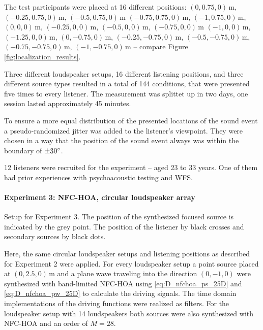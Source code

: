 The test participants were placed at 16 different positions: $(0,0.75,0)$\,m,
$(-0.25,0.75,0)$\,m, $(-0.5,0.75,0)$\,m $(-0.75,0.75,0)$\,m, $(-1,0.75,0)$\,m,
$(0,0,0)$\,m, $(-0.25,0,0)$\,m, $(-0.5,0,0)$\,m, $(-0.75,0,0)$\,m $(-1,0,0)$\,m,
$(-1.25,0,0)$\,m, $(0,-0.75,0)$\,m, $(-0.25,-0.75,0)$\,m, $(-0.5,-0.75,0)$\,m,
$(-0.75,-0.75,0)$\,m, $(-1,-0.75,0)$\,m -- compare
Figure\,\ref{fig:localization_results}.

Three different loudspeaker setups, 16 different listening positions, and
three different source types resulted in a total of 144 conditions, that were
presented five times to every listener. The measurement was splittet up in two
days, one session lasted approximately 45 minutes.

To ensure a more equal distribution of the presented locations of the sound
event a pseudo-randomized jitter was added to the listener's viewpoint.
They were chosen in a way that the position of the sound event always was within
the boundary of $\pm 30^\circ$.

12 listeners were recruited for the experiment -- aged 23 to 33 years.
One of them had prior experiences with psychoacoustic testing and \ac{WFS}.


\paragraph{Experiment 3: \ac{NFC-HOA}, circular loudspeaker array}
\label{sec:experiment3_nfchoa_circular_array}
%
\begin{marginfigure}
    \ft
    
    \caption{Setup for Experiment 3. The position of the synthesized focused
    source is indicated by the grey point. The position of the listener by black
    crosses and secondary sources by black dots.
        }
    \label{fig:setup_hoa_circular_array}
\end{marginfigure}
%
Here, the same circular loudspeaker setups and listening positions as described for
Experiment 2 were applied. For every loudspeaker setup a point source placed at
$(0,2.5,0)$\,m and a plane wave traveling into the direction
$(0,-1,0)$ were synthesized with band-limited \ac{NFC-HOA} using
\eqref{eq:D_nfchoa_ps_25D} and
\eqref{eq:D_nfchoa_pw_25D} to calculate the driving signals. The time domain
implementations of the driving functions were realized as filters.
For the loudspeaker setup with 14 loudspeakers both sources were
also synthesized with \ac{NFC-HOA} and an order of $M = 28$.

